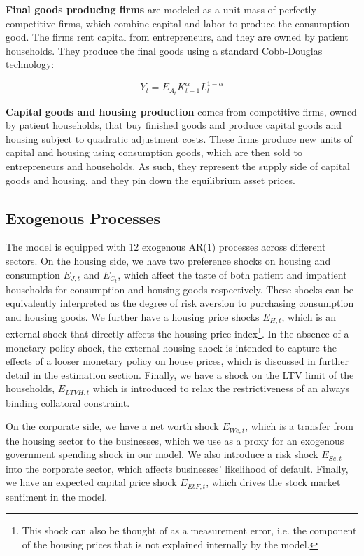 \documentclass[12pt]{article}
\numberwithin{equation}{section}
\begin{document}
\textbf{Final goods producing firms} are modeled as a unit mass of perfectly competitive firms, which combine capital and labor to produce the consumption good. The firms rent capital from entrepreneurs, and they are owned by patient households. They produce the final goods using a standard Cobb-Douglas technology: 

\begin{equation}
Y_{t}=E_{A_{t}} K^{\alpha}_{t-1}L^{1-\alpha}_{t}
\end{equation}

\textbf{Capital goods and housing production } comes from competitive firms, owned by patient households,  that buy finished goods and produce capital goods and housing subject to quadratic adjustment costs. These firms produce new units of capital and housing using consumption goods, which are then sold to entrepreneurs and households. As such, they represent the supply side of capital goods and housing, and they pin down the equilibrium asset prices. 

\subsection*{Exogenous Processes}
The model is equipped with 12 exogenous AR(1) processes across different sectors. On the housing side, we have two preference shocks on housing and consumption $E_{J,t}$ and $E_{C_t}$, which affect the taste of both patient and impatient households for consumption and housing goods respectively. These shocks can be equivalently interpreted as the degree of risk aversion to purchasing consumption and housing goods. We further have a housing price shocks $E_{H,t}$, which is an external shock that directly affects the housing price index\footnote{This shock can also be thought of as a measurement error, i.e. the component of the housing prices that is not explained internally by the model.}. In the absence of a monetary policy shock, the external housing shock is intended to capture the effects of a looser monetary policy on house prices, which is discussed in further detail in the estimation section. Finally, we have a shock on the LTV limit of the households, $E_{LTVH,t}$ which is introduced to relax the restrictiveness of an always binding collatoral constraint. 

On the corporate side, we have a net worth shock $E_{We,t}$, which is a transfer from the housing sector to the businesses, which we use as a proxy for an exogenous government spending shock in our model. We also introduce a risk shock $E_{Se,t}$ into the corporate sector, which affects businesses' likelihood of default. Finally, we have an expected capital price shock $E_{EbF,t}$, which drives the stock market sentiment in the model. 
\end{document}

